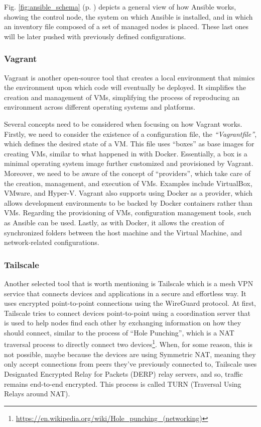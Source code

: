 Fig. \ref{fig:ansible_schema} (p. \pageref{fig:ansible_schema}) depicts a general view of how Ansible works, showing the control node, the system on which Ansible is installed, and in which an inventory file composed of a set of managed nodes is placed. These last ones will be later pushed with previously defined configurations.

\subsubsection{Vagrant} \label{sec:selected_tools_vagrant}

Vagrant is another open-source tool that creates a local environment that mimics the environment upon which code will eventually be deployed. It simplifies the creation and management of VMs, simplifying the process of reproducing an environment across different operating systems and platforms.

Several concepts need to be considered when focusing on how Vagrant works. Firstly, we need to consider the existence of a configuration file, the \textit{``Vagrantfile''}, which defines the desired state of a VM. This file uses ``boxes'' as base images for creating VMs, similar to what happened in with Docker. Essentially, a box is a minimal operating system image further customized and provisioned by Vagrant. Moreover, we need to be aware of the concept of ``providers'', which take care of the creation, management, and execution of VMs. Examples include VirtualBox, VMware, and Hyper-V. Vagrant also supports using Docker as a provider, which allows development environments to be backed by Docker containers rather than VMs. Regarding the provisioning of VMs, configuration management tools, such as Ansible can be used. Lastly, as with Docker, it allows the creation of synchronized folders between the host machine and the Virtual Machine, and network-related configurations.

\subsubsection{Tailscale} \label{sec:selected_tools_tailscale}

Another selected tool that is worth mentioning is Tailscale which is a mesh VPN service that connects devices and applications in a secure and effortless way. It uses encrypted point-to-point connections using the WireGuard protocol. At first, Tailscale tries to connect devices point-to-point using a coordination server that is used to help nodes find each other by exchanging information on how they should connect, similar to the process of ``Hole Punching'', which is a NAT traversal process to directly connect two devices\footnote{\url{https://en.wikipedia.org/wiki/Hole_punching_(networking)}}. When, for some reason, this is not possible, maybe because the devices are using Symmetric NAT, meaning they only accept connections from peers they've previously connected to, Tailscale uses Designated Encrypted Relay for Packets (DERP) relay servers, and so, traffic remains end-to-end encrypted. This process is called TURN (Traversal Using Relays around NAT).

